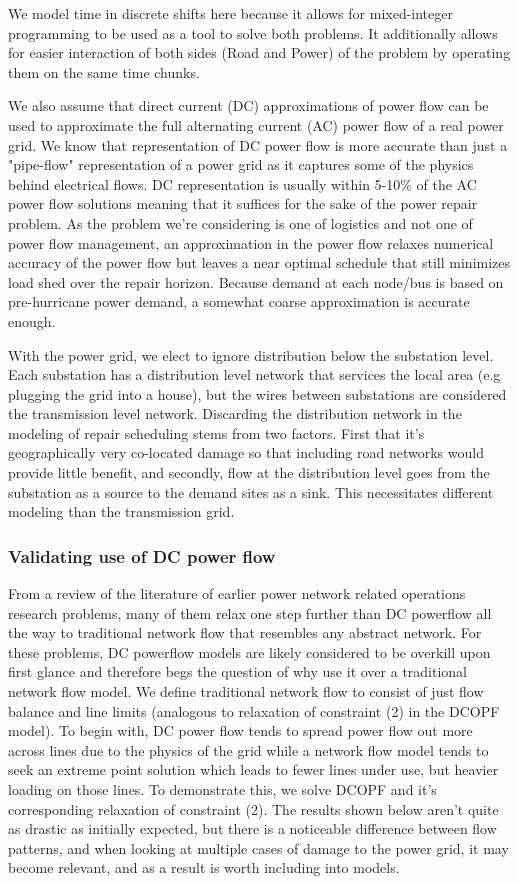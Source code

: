 \documentclass{article}
\begin{document}
	We model time in discrete shifts here because it allows for mixed-integer programming to be used as a tool to solve both problems. It additionally allows for easier interaction of both sides (Road and Power) of the problem by operating them on the same time chunks.
	
	We also assume that direct current (DC) approximations of power flow can be used to approximate the full alternating current (AC) power flow of a real power grid. We know that representation of DC power flow is more accurate than just a "pipe-flow" representation of a power grid as it captures some of the physics behind electrical flows. DC representation is usually within 5-10\% of the AC power flow solutions \cite{Frank2016} \cite{StottEA2009} meaning that it suffices for the sake of the power repair problem. As the problem we're considering is one of logistics and not one of power flow management, an approximation in the power flow relaxes numerical accuracy of the power flow but leaves a near optimal schedule that still minimizes load shed over the repair horizon. Because demand at each node/bus is based on pre-hurricane power demand, a somewhat coarse approximation is accurate enough.  
	
	With the power grid, we elect to ignore distribution below the substation level. Each substation has a distribution level network that services the local area (e.g plugging the grid into a house), but the wires between substations are considered the transmission level network. Discarding the distribution network in the modeling of repair scheduling stems from two factors. First that it's geographically very co-located damage so that including road networks would provide little benefit, and secondly, flow at the distribution level goes from the substation as a source to the demand sites as a sink. This necessitates different modeling than the transmission grid.
	\subsubsection{Validating use of DC power flow}
	
	From a review of the literature of earlier power network related operations research problems, many of them relax one step further than DC powerflow all the way to traditional network flow that resembles any abstract network. For these problems, DC powerflow models are likely considered to be overkill upon first glance and therefore begs the question of why use it over a traditional network flow model. We define traditional network flow to consist of just flow balance and line limits (analogous to relaxation of constraint (2) in the DCOPF model). To begin with, DC power flow tends to spread power flow out more across lines due to the physics of the grid while a network flow model tends to seek an extreme point solution which leads to fewer lines under use, but heavier loading on those lines. To demonstrate this, we solve DCOPF and it's corresponding relaxation of constraint (2). The results shown below aren't quite as drastic as initially expected, but there is a noticeable difference between flow patterns, and when looking at multiple cases of damage to the power grid, it may become relevant, and as a result is worth including into models.
	
\end{document}
